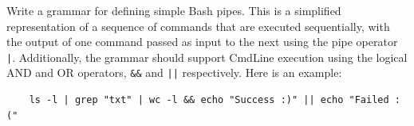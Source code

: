 \documentclass[10pt, a4paper]{article}
\begin{document}
\FloatBarrier



Write a grammar for defining simple Bash pipes. This is a simplified representation of a sequence of commands that are executed sequentially, with the output of one command passed as input to the next using the pipe operator \texttt{|}. Additionally, the grammar should support CmdLine execution using the logical AND and OR operators, \texttt{\&\&} and  \texttt{||} respectively. Here is an example:


\begin{lstlisting}
    ls -l | grep "txt" | wc -l && echo "Success :)" || echo "Failed :("
\end{lstlisting}
\end{document}
